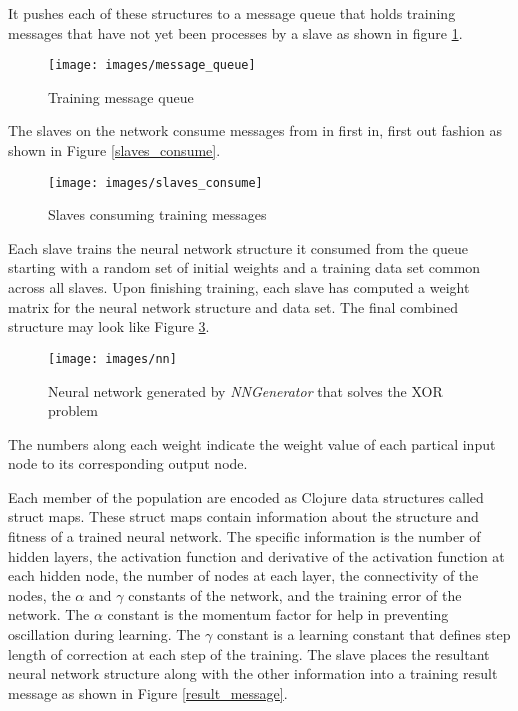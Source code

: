 It pushes each of these structures to a message queue that holds training messages that have not yet been processes by a slave as shown in figure \ref{message_queue}.

\begin{figure}[h!]
  \centering
  \texttt{[image: images/message\_queue]}
  \caption{Training message queue}
  \label{message_queue}
\end{figure}

The slaves on the network consume messages from in first in, first out fashion as shown in Figure \ref{slaves_consume}.

\begin{figure}[h!]
  \centering
  \texttt{[image: images/slaves\_consume]}
  \caption{Slaves consuming training messages}
  \label{slave_consume}
\end{figure}

Each slave trains the neural network structure it consumed from the queue starting with a random set of initial weights and a training data set common across all slaves.
Upon finishing training, each slave has computed a weight matrix for the neural network structure and data set.
The final combined structure may look like Figure \ref{nn_combined}. 

\begin{figure}[h!]
  \centering
  \texttt{[image: images/nn]}
  \caption{Neural network generated by {\it NNGenerator} that solves the XOR problem}
  \label{nn_combined}
\end{figure}

The numbers along each weight indicate the weight value of each partical input node to its corresponding output node. 

Each member of the population are encoded as Clojure data structures called struct maps. 
These struct maps contain information about the structure and fitness of a trained neural network. 
The specific information is the number of hidden layers, the activation function and derivative of the activation function at each hidden node, the number of nodes at each layer, the connectivity of the nodes, the $\alpha$ and $\gamma$ constants of the network, and the training error of the network. 
The $\alpha$ constant is the momentum factor for help in preventing oscillation during learning. 
The $\gamma$ constant is a learning constant that defines step length of correction at each step of the training.
The slave places the resultant neural network structure along with the other information into a training result message as shown in Figure \ref{result_message}.

